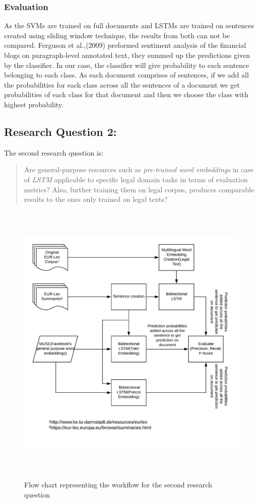 \subsubsection*{Evaluation} \label{evaluationQuestionOne}
As the SVMs are trained on full documents and LSTMs are trained on sentences created using sliding window technique, the results from both can not be compared. Ferguson et al.,(2009) preformed sentiment analysis of the financial blogs on paragraph-level 
annotated text, they summed up the predictions given by the classifier. In our case, the classifier will give probability to each sentence belonging to each class. As each document comprises of sentences, if we add all the probabilities for each class across all the sentences of a document we get probabilities of each class for that document and then we choose the class with highest probability.

\subsection{Research Question 2:} \label{question2}
The second research question is:

\begin{quote}
    Are general-purpose resources such as \textit{pre-trained word embeddings} in case of \textit{LSTM} applicable to specific legal domain tasks in terms of evaluation metrics? Also, further training them on legal corpus, produces comparable results to the ones only trained on legal texts?
\end{quote}

\begin{figure}[!ht]
    \centering
    \includegraphics[width=15cm, height=14cm,keepaspectratio]{pics/flowforQuestion2.jpeg}
    \caption{Flow chart representing the workflow for the second research question}
    \label{fig:FlowResearchQuestion2}
\end{figure}

